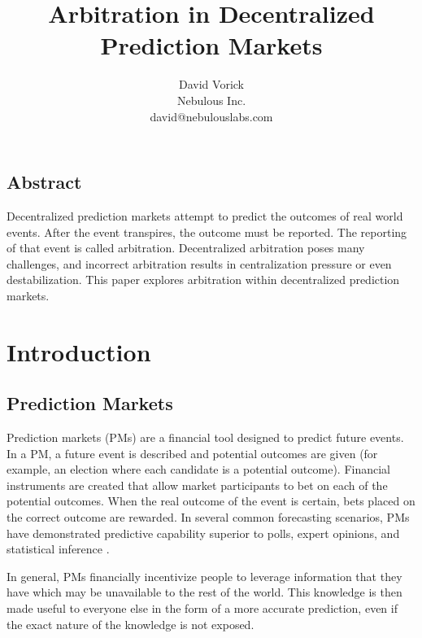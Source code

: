 \documentclass[onecolumn]{article}
\begin{document}
\frenchspacing

\title{Arbitration in Decentralized Prediction Markets}

\author{
{\rm David Vorick}\\
Nebulous Inc.\\
david@nebulouslabs.com
}

\maketitle

\subsection*{Abstract}
Decentralized prediction markets attempt to predict the outcomes of real world events.
After the event transpires, the outcome must be reported.
The reporting of that event is called arbitration.
Decentralized arbitration poses many challenges, and incorrect arbitration results in centralization pressure or even destabilization.
This paper explores arbitration within decentralized prediction markets.

\section{Introduction}

\subsection{Prediction Markets}
Prediction markets (PMs) are a financial tool designed to predict future events.
In a PM, a future event is described and potential outcomes are given (for example, an election where each candidate is a potential outcome).
Financial instruments are created that allow market participants to bet on each of the potential outcomes.
When the real outcome of the event is certain, bets placed on the correct outcome are rewarded.
In several common forecasting scenarios, PMs have demonstrated predictive capability superior to polls, expert opinions, and statistical inference \cite{promise}.

In general, PMs financially incentivize people to leverage information that they have which may be unavailable to the rest of the world.
This knowledge is then made useful to everyone else in the form of a more accurate prediction, even if the exact nature of the knowledge is not exposed.
\end{document}
